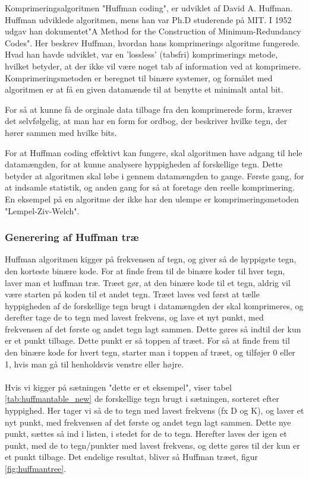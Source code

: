 Komprimeringsalgoritmen "Huffman coding", er udviklet af David A. Huffman. Huffman udviklede algoritmen, mens han var Ph.D studerende på MIT. I 1952 udgav han dokumentet"A Method for the Construction of Minimum-Redundancy Codes"\cite{A_Method_for}. Her beskrev Huffman, hvordan hans komprimerings algoritme fungerede. Hvad han havde udviklet, var en 'lossless' (tabsfri) komprimerings metode, hvilket betyder, at der ikke vil være noget tab af information ved at komprimere. Komprimeringsmetoden er beregnet til binære systemer, og formålet med algoritmen er at få en given datamænde til at benytte et minimalt antal bit. 

For så at kunne få de orginale data tilbage fra den komprimerede form, kræver det selvfølgelig, at man har en form for ordbog, der beskriver hvilke tegn, der hører sammen med hvilke bits.

For at Huffman coding effektivt kan fungere, skal algoritmen have adgang til hele datamængden, for at kunne analysere hyppigheden af forskellige tegn. Dette betyder at algoritmen skal løbe i gennem datamængden to gange. Første gang, for at indsamle statistik, og anden gang for så at foretage den reelle komprimering. En eksempel på en algoritme der ikke har den ulempe er komprimeringsmetoden "Lempel-Ziv-Welch".


\subsubsection{Generering af Huffman træ}
Huffman algoritmen kigger på frekvensen af tegn, og giver så de hyppigste tegn, den korteste binære kode. For at finde frem til de binære koder til hver tegn, laver man et huffman træ. Træet gør, at den binære kode til et tegn, aldrig vil være starten på koden til et andet tegn. Træet laves ved først at tælle hyppigheden af de forskellige tegn brugt i datamængden der skal komprimeres, og derefter tage de to tegn med lavest frekvens, og lave et nyt punkt, med frekvensen af det første og andet tegn lagt sammen. Dette gøres så indtil der kun er et punkt tilbage. Dette punkt er så toppen af træet. For så at finde frem til den binære kode for hvert tegn, starter man i toppen af træet, og tilføjer 0 eller 1, hvis man gå til henholdsvis venstre eller højre.
\\
\\
Hvis vi kigger på sætningen "dette er et eksempel", viser tabel \ref{tab:huffmantable_new} de forskellige tegn brugt i sætningen, sorteret efter hyppighed. Her tager vi så de to tegn med lavest frekvens (fx D og K), og laver et nyt punkt, med frekvensen af det første og andet tegn lagt sammen. Dette nye punkt, sættes så ind i listen, i stedet for de to tegn. Herefter laves der igen et punkt, med de to tegn/punkter med lavest frekvens, og dette gøres til der kun er et punkt tilbage. Det endelige resultat, bliver så Huffman træet, figur \ref{fig:huffmantree}. 




